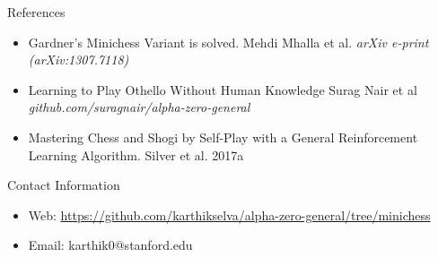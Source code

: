 \documentclass[final]{beamer}
\newlength{\onecolwid}
\begin{document}
\begin{frame}[t]
\begin{columns}[t]
\begin{column}{\onecolwid}

\begin{block}{References}


\begin{itemize}{}

\item Gardner's Minichess Variant is solved. Mehdi Mhalla et al. {\em arXiv e-print (arXiv:1307.7118) }
\item Learning to Play Othello Without Human Knowledge Surag Nair et al {\em github.com/suragnair/alpha-zero-general}
\item Mastering Chess and Shogi by Self-Play with a General Reinforcement Learning Algorithm. Silver et al. 2017a
\end{itemize}

\end{block}






\begin{alertblock}{Contact Information}

\begin{itemize}
\item Web: \href{https://github.com/karthikselva/alpha-zero-general/tree/minichess}{https://github.com/karthikselva/alpha-zero-general/tree/minichess}
\item Email: karthik0@stanford.edu
\end{itemize}

\end{alertblock}



\end{column} %

\end{columns} %

\end{frame} %
\end{document}
